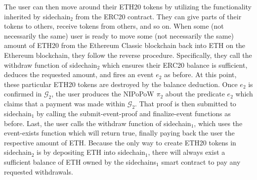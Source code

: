 The user can then move around their ETH20 tokens by utilizing the functionality
inherited by \textsf{sidechain}$_2$ from the \textsf{ERC20} contract. They can
give parts of their tokens to others, receive tokens from others, and so on.
When some (not necessarily the same) user is ready to move some (not necessarily
the same) amount of ETH20 from the Ethereum Classic blockchain back into ETH
on the Ethereum blockchain, they follow the reverse procedure. Specifically,
they call the \textsf{withdraw} function of \textsf{sidechain}$_2$ which ensures
their ERC20 balance is sufficient, deduces the requested amount, and fires an
event $e_2$ as before. At this point, these particular ETH20 tokens are
destroyed by the balance deduction. Once $e_2$ is confirmed in $\mathcal{G}_2$,
the user produces the NIPoPoW $\pi_2$ about the predicate $e_2$ which claims
that a payment was made within $\mathcal{G}_2$. That proof is then submitted to
\textsf{sidechain}$_1$ by calling the \textsf{submit-event-proof} and
\textsf{finalize-event} functions as before. Last, the user calls the
\textsf{withdraw} function of \textsf{sidechain}$_1$, which uses the
\textsf{event-exists} function which will return \textsf{true}, finally paying
back the user the respective amount of ETH. Because the only way to create ETH20
tokens in \textsf{sidechain}$_2$ is by depositing ETH into
\textsf{sidechain}$_1$, there will always exist a sufficient balance of ETH
owned by the \textsf{sidechains}$_1$ smart contract to pay any requested
withdrawals.

